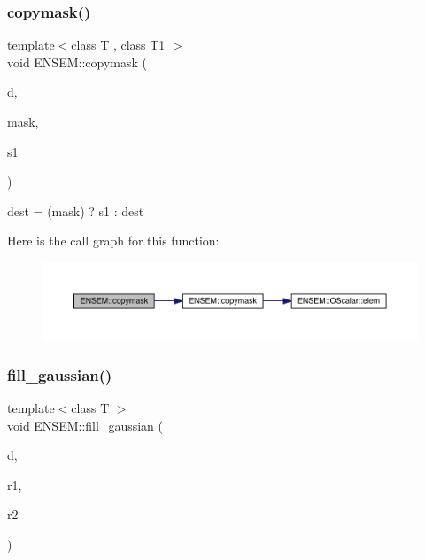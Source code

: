 \subsubsection{\texorpdfstring{copymask()}{copymask()}}
{\footnotesize\ttfamily template$<$class T , class T1 $>$ \\
void E\+N\+S\+E\+M\+::copymask (\begin{DoxyParamCaption}\item[{\mbox{\hyperlink{classENSEM_1_1RComplex}{R\+Complex}}$<$ T $>$ \&}]{d,  }\item[{const \mbox{\hyperlink{classENSEM_1_1RScalar}{R\+Scalar}}$<$ T1 $>$ \&}]{mask,  }\item[{const \mbox{\hyperlink{classENSEM_1_1RComplex}{R\+Complex}}$<$ T $>$ \&}]{s1 }\end{DoxyParamCaption})\hspace{0.3cm}{\ttfamily [inline]}}



dest = (mask) ? s1 \+: dest 

Here is the call graph for this function\+:\nopagebreak
\begin{figure}[H]
\begin{center}
\leavevmode
\includegraphics[width=350pt]{da/dc7/group__rcomplex_ga8228a6185ea266e1e7d4c221c76bd5f1_cgraph}
\end{center}
\end{figure}
\mbox{\label{group__rcomplex_gaa47b1150a227265f108216052a5029d8}} 
\subsubsection{\texorpdfstring{fill\_gaussian()}{fill\_gaussian()}}
{\footnotesize\ttfamily template$<$class T $>$ \\
void E\+N\+S\+E\+M\+::fill\+\_\+gaussian (\begin{DoxyParamCaption}\item[{\mbox{\hyperlink{classENSEM_1_1RComplex}{R\+Complex}}$<$ T $>$ \&}]{d,  }\item[{\mbox{\hyperlink{classENSEM_1_1RComplex}{R\+Complex}}$<$ T $>$ \&}]{r1,  }\item[{\mbox{\hyperlink{classENSEM_1_1RComplex}{R\+Complex}}$<$ T $>$ \&}]{r2 }\end{DoxyParamCaption})\hspace{0.3cm}{\ttfamily [inline]}}



